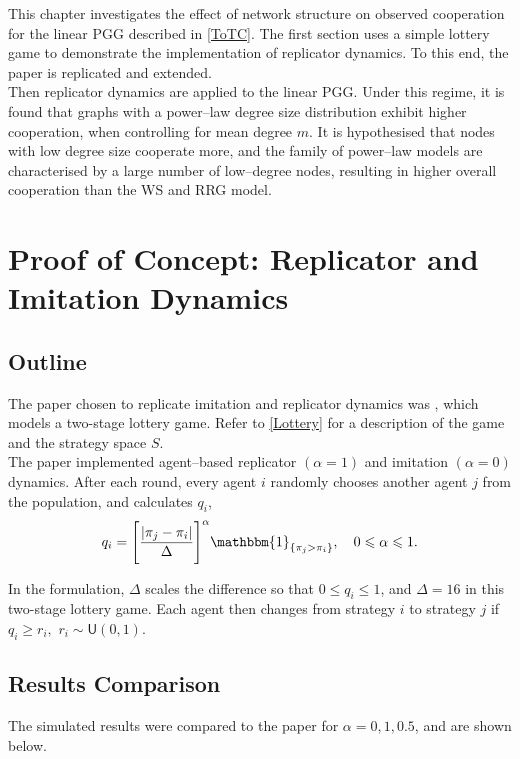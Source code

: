 This chapter investigates the effect of network structure on observed cooperation for the linear PGG described in \ref{ToTC}. The first section uses a simple lottery game to demonstrate the implementation of replicator dynamics. To this end, the paper \cite{RN30} is replicated and extended. \\

Then replicator dynamics are applied to the linear PGG. Under this regime, it is found that graphs with a power--law degree size distribution exhibit higher cooperation, when controlling for mean degree $m$. It is hypothesised that nodes with low degree size cooperate more, and the family of power--law models are characterised by a large number of low--degree nodes, resulting in higher overall cooperation than the WS and RRG model. \\
\section{Proof of Concept: Replicator and Imitation Dynamics} \label{Lottery_Me}
\subsection{Outline}
The paper chosen to replicate imitation and replicator dynamics was \cite{RN30}, which models a two-stage lottery game. Refer to \ref{Lottery} for a description of the game and the strategy space $S$. \\

The paper implemented agent--based replicator $(\alpha = 1)$ and imitation $(\alpha = 0)$ dynamics. After each round, every agent $i$ randomly chooses another agent $j$ from the population, and calculates $q_i$, \\

\begin{align} \label{rep}
q_i = \Bigg[ \frac{|\pi_j - \pi_i|}{\Delta} \Bigg]^\alpha \mathbbm{1}_{\{\pi_j>\pi_i\}}, \quad  0 \leq \alpha \leq 1.\end{align} 

In the formulation, $\Delta$ scales the difference so that $0 \leq q_i \leq 1$, and $\Delta = 16$ in this two-stage lottery game. Each agent then changes from strategy $i$ to strategy $j$ if $q_i \geq r_i,$ $r_i \sim \mathsf{U}(0,1)$. \\

\subsection{Results Comparison}
The simulated results were compared to the paper for $\alpha = 0, 1, 0.5$, and are shown below. \\

